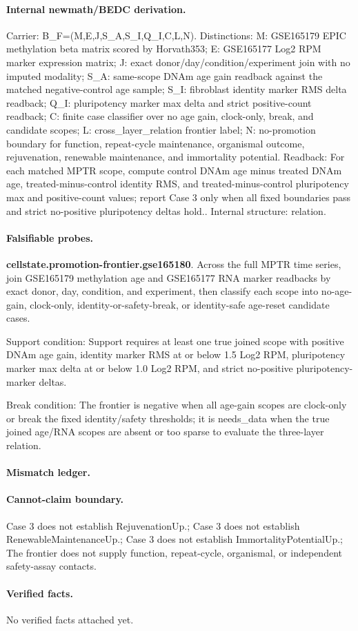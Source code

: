 \paragraph{Internal newmath/BEDC derivation.} Carrier: B\_F=(M,E,J,S\_A,S\_I,Q\_I,C,L,N). Distinctions: M: GSE165179 EPIC methylation beta matrix scored by Horvath353; E: GSE165177 Log2 RPM marker expression matrix; J: exact donor/day/condition/experiment join with no imputed modality; S\_A: same-scope DNAm age gain readback against the matched negative-control age sample; S\_I: fibroblast identity marker RMS delta readback; Q\_I: pluripotency marker max delta and strict positive-count readback; C: finite case classifier over no age gain, clock-only, break, and candidate scopes; L: cross\_layer\_relation frontier label; N: no-promotion boundary for function, repeat-cycle maintenance, organismal outcome, rejuvenation, renewable maintenance, and immortality potential. Readback: For each matched MPTR scope, compute control DNAm age minus treated DNAm age, treated-minus-control identity RMS, and treated-minus-control pluripotency max and positive-count values; report Case 3 only when all fixed boundaries pass and strict no-positive pluripotency deltas hold.. Internal structure: relation.

\paragraph{Falsifiable probes.}
\textbf{cellstate.promotion-frontier.gse165180}. Across the full MPTR time series, join GSE165179 methylation age and GSE165177 RNA marker readbacks by exact donor, day, condition, and experiment, then classify each scope into no-age-gain, clock-only, identity-or-safety-break, or identity-safe age-reset candidate cases.

Support condition: Support requires at least one true joined scope with positive DNAm age gain, identity marker RMS at or below 1.5 Log2 RPM, pluripotency marker max delta at or below 1.0 Log2 RPM, and strict no-positive pluripotency-marker deltas.

Break condition: The frontier is negative when all age-gain scopes are clock-only or break the fixed identity/safety thresholds; it is needs\_data when the true joined age/RNA scopes are absent or too sparse to evaluate the three-layer relation.

\paragraph{Mismatch ledger.}
\paragraph{Cannot-claim boundary.} Case 3 does not establish RejuvenationUp.; Case 3 does not establish RenewableMaintenanceUp.; Case 3 does not establish ImmortalityPotentialUp.; The frontier does not supply function, repeat-cycle, organismal, or independent safety-assay contacts.

\paragraph{Verified facts.}
No verified facts attached yet.

